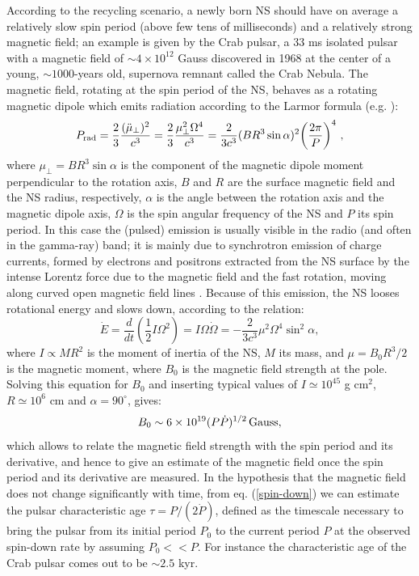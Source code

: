 \documentclass[graybox]{svmult}
\begin{document}
According to the recycling scenario, a newly born NS should have on average a relatively slow spin period (above few tens of milliseconds) and a relatively strong magnetic field; an example is given by the Crab pulsar, a 33 ms isolated pulsar with a magnetic field of $\sim 4 \times 10^{12}$ Gauss discovered in 1968 at the center of a young, $\sim 1000$-years old, supernova remnant called the Crab Nebula. The magnetic field, rotating at the spin period of the NS, behaves as a rotating magnetic dipole which emits radiation according to the Larmor formula (e.g. \cite{Jackson}):  
\begin{equation}
\label{Larmor}
P_{\rm rad} = \frac{2}{3} \frac{(\ddot{\mu}_\bot)^2}{c^3} = 
\frac{2}{3}\frac{\mu_\bot^2 \Omega^4}{c^3} = \frac{2}{3c^3}( B R^3 \sin \alpha)^2 \biggl( \frac{2\pi}{P} \biggr)^4~,
\end{equation}
where $\mu_\bot = B R^3 \sin \alpha$ is the component of the magnetic dipole moment perpendicular to the rotation axis, $B$ and $R$ are the surface magnetic field and the NS radius, respectively, $\alpha$ is the angle between the rotation axis and the magnetic dipole axis, $\Omega$ is the spin angular frequency of the NS and $P$ its spin period. 
In this case the (pulsed) emission is usually visible in the radio (and often in the gamma-ray) band; it is mainly due to synchrotron emission of charge currents, formed by electrons and positrons extracted from the NS surface by the intense Lorentz force due to the magnetic field and the fast rotation, moving along curved open magnetic field lines \cite{Jackson}. Because of this emission, the NS looses rotational energy and slows down, according to the relation:
\begin{equation}
\label{spin-down}
\dot E = \frac{d}{dt} \left(\frac{1}{2} I \Omega^2\right) = I \Omega \dot \Omega = -\frac{2}{3 c^3} \mu^2 \Omega^4 \sin^2 \alpha,
\end{equation}
where $I \propto M R^2$ is the moment of inertia of the NS, $M$ its mass, and $\mu = B_0 R^3/2$ is the magnetic moment, where $B_0$ is the magnetic field strength at the pole. Solving this equation for $B_0$ and inserting typical values of $I \simeq 10^{45}$ g cm$^2$, $R\simeq10^6$ cm and $\alpha = 90^\circ$, gives: 
\begin{equation}
\label{B0}
B_0 \sim 6 \times 10^{19} (P \dot P)^{1/2}\, \rm Gauss,
\end{equation}
which allows to relate the magnetic field strength with the spin period and its derivative, and hence to give an estimate of the magnetic field once the spin period and its derivative are measured. In the hypothesis that the magnetic field does not change significantly with time, from eq. (\ref{spin-down}) we can estimate the pulsar characteristic age $\tau = P / (2 \dot P)$, defined as the timescale necessary to bring the pulsar from its initial period $P_0$ to the current period $P$ at the observed spin-down rate by assuming $P_0<<P$. For instance the characteristic age of the Crab pulsar comes out to be $\sim 2.5$ kyr. 
\end{document}
